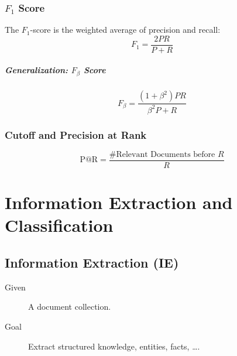 		\subsection{\( F _ 1 \) Score} %
			The \(F_1\)-score is the weighted average of precision and recall:
			\begin{equation*}
				F_1 = \frac{2PR}{P + R} \tag{Harmonic Mean of \(P\) and \(R\)}
			\end{equation*}

			\paragraph{Generalization: \( F _ \beta \) Score}
				\begin{equation*}
					F _ \beta = \frac{(1 + \beta^2) P R}{\beta^2 P + R}
				\end{equation*}

		\subsection{Cutoff and Precision at Rank} %
			\begin{equation*}
				\text{P@R} = \frac{\text{\#Relevant Documents before } R}{R} \tag{Precision at Rank}
			\end{equation*}

\chapter{Information Extraction and Classification} %
\section{Information Extraction (IE)} %
	\begin{description}
		\item[Given] A document collection.
		\item[Goal] Extract structured knowledge, entities, facts, \dots.
	\end{description}

